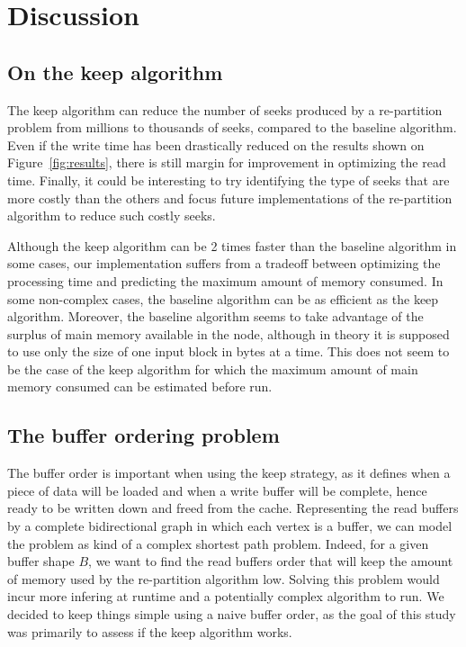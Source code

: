 \documentclass[sigconf, nonacm]{acmart}
\begin{document}
\section{Discussion}

\subsection{On the keep algorithm}
The keep algorithm can reduce the number of seeks produced by a re-partition
problem from millions to thousands of seeks, compared to the baseline algorithm.
Even if the write time has been drastically reduced on the results shown on
Figure~\ref{fig:results}, there is still margin for improvement in optimizing
the read time.
Finally, it could be interesting to try identifying the type of seeks that are
more costly than the others and focus future implementations of the re-partition
algorithm to reduce such costly seeks.

Although the keep algorithm can be 2 times faster than the baseline algorithm
in some cases, our implementation suffers from a tradeoff between optimizing
the processing time and predicting the maximum amount of memory consumed.
In some non-complex cases, the baseline algorithm can be as efficient as the
keep algorithm.
Moreover, the baseline algorithm seems to take advantage of the surplus of
main memory available in the node, although in theory it is supposed to use
only the size of one input block in bytes at a time.
This does not seem to be the case of the keep algorithm for which the maximum
amount of main memory consumed can be estimated before run.

\subsection{The buffer ordering problem}
The buffer order is important when using the keep strategy, as it defines when
a piece of data will be loaded and when a write buffer will be complete, hence
ready to be written down and freed from the cache.
Representing the read buffers by a complete bidirectional graph in which each
vertex is a buffer, we can model the problem as kind of a complex shortest path
problem.
Indeed, for a given buffer shape $B$, we want to find the read buffers order
that will keep the amount of memory used by the re-partition algorithm low.
Solving this problem would incur more infering at runtime and a potentially
complex algorithm to run.
We decided to keep things simple using a naive buffer order, as the goal of
this study was primarily to assess if the keep algorithm works.
\end{document}
